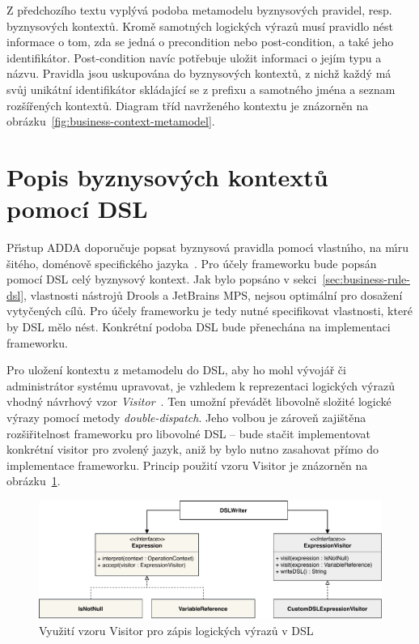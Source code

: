 Z předchozího textu vyplývá podoba metamodelu byznysových pravidel, resp. byznysových kontextů.
Kromě samotných logických výrazů musí pravidlo nést informace o tom, zda
se jedná o precondition nebo post-condition, a také jeho identifikátor.
Post-condition navíc potřebuje uložit informaci o jejím typu a názvu. Pravidla jsou uskupována
do byznysových kontextů, z nichž každý má svůj unikátní identifikátor skládající se z prefixu
a samotného jména a seznam rozšířených kontextů. Diagram tříd navrženého kontextu je znázorněn
na obrázku~\ref{fig:business-context-metamodel}.

\section{Popis byznysových kontextů pomocí \gls{DSL}}

Př\'{\i}stup \gls{ADDA} doporučuje popsat byznysová pravidla pomoc\'{\i}
vlastn\'{\i}ho, na m\'{\i}ru šitého, doménově specifického jazyka~\cite{cemus2015automated}.
Pro účely frameworku bude popsán pomocí \gls{DSL} celý byznysový kontext.
Jak bylo popsáno v sekci~\ref{sec:business-rule-dsl}, vlastnosti nástrojů Drools a JetBrains MPS,
nejsou optimální pro dosažení vytyčených cílů. Pro účely frameworku je tedy nutné specifikovat vlastnosti,
které by \gls{DSL} mělo nést. Konkrétní podoba DSL bude přenechána na implementaci frameworku.

Pro uložení kontextu z metamodelu do \gls{DSL}, aby ho mohl vývojář či administrátor
systému upravovat, je vzhledem k reprezentaci logických výrazů vhodný návrhový vzor
\textit{Visitor}~\cite{fowler2002patterns}. Ten umožní převádět libovolně složité logické
výrazy pomocí metody \textit{double-dispatch}. Jeho volbou je zároveň zajištěna rozšiřitelnost
frameworku pro libovolné \gls{DSL} -- bude stačit implementovat konkrétní
visitor pro zvolený jazyk, aniž by bylo nutno zasahovat přímo do implementace frameworku.
Princip použití vzoru Visitor je znázorněn na obrázku~\ref{fig:expression-visitor}.

\begin{figure}
    \centering
    \includegraphics[keepaspectratio=true, width=1\linewidth]{figures/expression-visitor.pdf}
    \caption{Využití vzoru Visitor pro zápis logických výrazů v \gls{DSL}}
    \label{fig:expression-visitor}
\end{figure}

